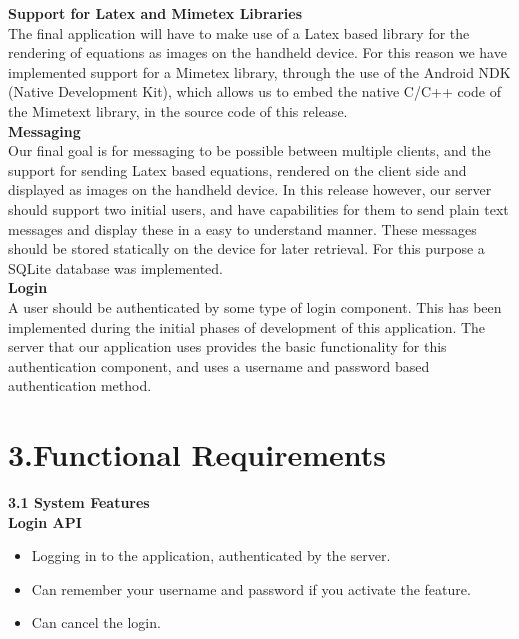 \documentclass[29pt,a4paper]{moderncv}
\begin{document}
		\noindent\textbf{Support for Latex and Mimetex Libraries}
		\\The final application will have to make use of a Latex based library for the rendering of equations as images on the handheld device. For this reason we have implemented support for a Mimetex library, through the use of the Android NDK (Native Development Kit), which allows us to embed the native C/C++ code of the Mimetext library, in the source code of this release.\\
		
		
		\noindent\textbf{Messaging}
		\\Our final goal is for messaging to be possible between multiple clients, and the support for sending Latex based equations, rendered on the client side and displayed as images on the handheld device. In this release however, our server should support two initial users, and have capabilities for them to send plain text messages and display these in a easy to understand manner.  These messages should be stored statically on the device for later retrieval.  For this purpose a SQLite database was implemented.\\
		
		\noindent\textbf{Login}
		\\A user should be authenticated by some type of login component.  This has been implemented during the initial phases of development of this application.  The server that our application uses provides the basic functionality for this authentication component, and uses a username and password based authentication method.
		
		
	\vspace{5mm}
	
\newpage	
	\section*{\textbf{3.Functional Requirements}}
	\vspace{4mm}
	\noindent \textbf{3.1 System Features}\\
	
		\noindent \textbf{Login API}
		\begin{itemize}
			\item Logging in to the application, authenticated by the server.
			\item Can remember your username and password if you activate the feature.
			\item Can cancel the login.\\
		\end{itemize}
		
\end{document}
